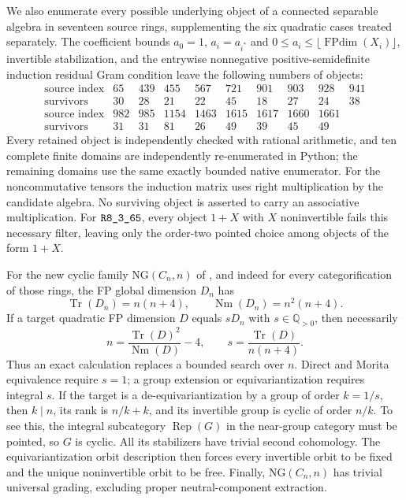 We also enumerate every possible underlying object of a connected
separable algebra in seventeen source rings, supplementing the six
quadratic cases treated separately.
The coefficient bounds $a_0=1$, $a_i=a_{i^*}$ and
$0\leq a_i\leq\lfloor\operatorname{FPdim}(X_i)\rfloor$, invertible
stabilization, and the entrywise nonnegative positive-semidefinite
induction residual Gram condition leave the following numbers of objects:
\[
\begin{array}{c|rrrrrrrrr}
\text{source index}&65&439&455&567&721&901&903&928&941\\
\text{survivors}&30&28&21&22&45&18&27&24&38\\[2pt]
\text{source index}&982&985&1154&1463&1615&1617&1660&1661&\\
\text{survivors}&31&31&81&26&49&39&45&49&
\end{array}
\]
Every retained object is independently checked with rational arithmetic,
and ten complete finite domains are independently re-enumerated in
Python; the remaining domains use the same exactly bounded native
enumerator. For the noncommutative tensors
the induction matrix uses right multiplication by the candidate algebra.
No surviving object is asserted to carry an associative multiplication.
For $\sha{R8_3_65}$, every object $1+X$ with $X$ noninvertible fails this
necessary filter, leaving only the order-two pointed choice among
objects of the form $1+X$.

For the new cyclic family $\mathrm{NG}(C_n,n)$ of
\cite[Theorem~2.10 and Remark~2.11]{NearGroupTPE2026}, and indeed for every
categorification of those rings, the FP global dimension $D_n$ has
\[
\operatorname{Tr}(D_n)=n(n+4),\qquad
\operatorname{Nm}(D_n)=n^2(n+4).
\]
If a target quadratic FP dimension $D$ equals $sD_n$ with $s\in\mathbb Q_{>0}$,
then necessarily
\[
n=\frac{\operatorname{Tr}(D)^2}{\operatorname{Nm}(D)}-4,
\qquad
s=\frac{\operatorname{Tr}(D)}{n(n+4)}.
\]
Thus an exact calculation replaces a bounded search over $n$. Direct and
Morita equivalence require $s=1$; a group extension or equivariantization
requires integral $s$. If the target is a de-equivariantization by a group
of order $k=1/s$, then $k\mid n$, its rank is $n/k+k$, and its invertible
group is cyclic of order $n/k$. To see this, the integral subcategory
$\operatorname{Rep}(G)$ in the near-group category must be pointed, so
$G$ is cyclic. All its stabilizers have trivial second cohomology.
The equivariantization orbit description
\cite[Corollary~2.13 and Remark~3.1]{BurciuNataleEquivariantization}
then forces every invertible orbit to be fixed and the unique
noninvertible orbit to be free. Finally, $\mathrm{NG}(C_n,n)$ has trivial
universal grading, excluding proper neutral-component extraction.

